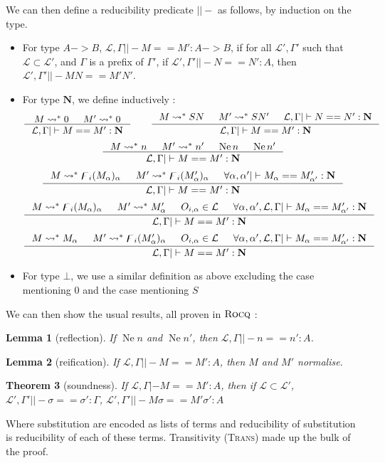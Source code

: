 \documentclass[11pt]{article}
\newtheorem{theorem}{Theorem}[section]
\newtheorem{lemma}[theorem]{Lemma}
\DeclareMathOperator{\neu}{Ne}
\newcommand{\0}{\mathbf{0}}
\newcommand{\1}{\mathbf{1}}
\newcommand{\nat}{\mathbf{N}}
\newcommand{\tctx}{\Gamma}
\newcommand{\fctx}{\mathcal{L}}
\begin{document}
We can then define a reducibility predicate $||-$ as follows, by induction on the type.
\begin{itemize}
    \item For type $A -> B$, $\fctx,\tctx ||- M == M' : A -> B$, if for all $\fctx',\tctx'$ such that $\fctx\subset\fctx'$, and $\tctx$ is a prefix of $\tctx'$, if $\fctx',\tctx' ||- N == N' : A$, then $\fctx', \tctx' ||- MN == M'N'$.
    \item For type $\nat$, we define inductively :
$$
    \inference{M \leadsto^\ast 0&M' \leadsto^\ast 0}{\fctx,\tctx ||- M == M' : \nat}\qquad
    \inference{M \leadsto^\ast SN&M' \leadsto^\ast SN' &\fctx,\tctx ||- N == N' : \nat}{\fctx,\tctx ||- M == M' : \nat}
$$
$$
    \inference{M \leadsto^\ast n&M' \leadsto^\ast n' &\neu n & \neu n'}{\fctx,\tctx ||- M == M' : \nat}
$$
$$
    \inference{M \leadsto^\ast \digamma_i (M_\alpha)_\alpha&M' \leadsto^\ast \digamma_i({M'_\alpha})_\alpha & \forall \alpha,\alpha' ||- M_\alpha == M'_{\alpha'} : \nat}{\fctx,\tctx ||- M == M' : \nat}
$$
$$
    \inference{M \leadsto^\ast \digamma_i(M_\alpha)_\alpha&M' \leadsto^\ast M'_\alpha & O_{i,\alpha}\in \fctx & \forall \alpha,\alpha', \fctx,\tctx ||- M_\alpha == M'_{\alpha'} : \nat}{\fctx,\tctx ||- M == M' : \nat}
$$
$$
    \inference{M \leadsto^\ast M_\alpha&M' \leadsto^\ast \digamma_i (M'_\alpha)_\alpha & O_{i,\alpha}\in \fctx & \forall \alpha,\alpha', \fctx,\tctx ||- M_\alpha == M'_{\alpha'} : \nat}{\fctx,\tctx ||- M == M' : \nat}
$$
    \item For type $\bot$, we use a similar definition as above excluding the case mentioning $0$ and the case mentioning $S$ 
\end{itemize}

We can then show the usual results, all proven in $\textsc{Rocq}$ :

\begin{lemma}[reflection]
    If $\neu n$ and $\neu n'$, then $\fctx,\tctx ||- n == n' : A$.
\end{lemma}
\begin{lemma}[reification]
    If $\fctx,\tctx ||- M == M' : A$, then $M$ and $M'$ normalise.
\end{lemma}

\begin{theorem}[soundness]
    If $\fctx,\tctx |- M == M' : A$, then if $\fctx \subset \fctx'$, $\fctx',\tctx'||-\sigma == \sigma' : \Gamma$, $\fctx',\tctx' ||- M\sigma == M'\sigma' : A$
\end{theorem}
Where substitution are encoded as lists of terms and reducibility of substitution is reducibility of each of these terms. Transitivity (\textsc{Trans}) made up the bulk of the proof.
\end{document}
